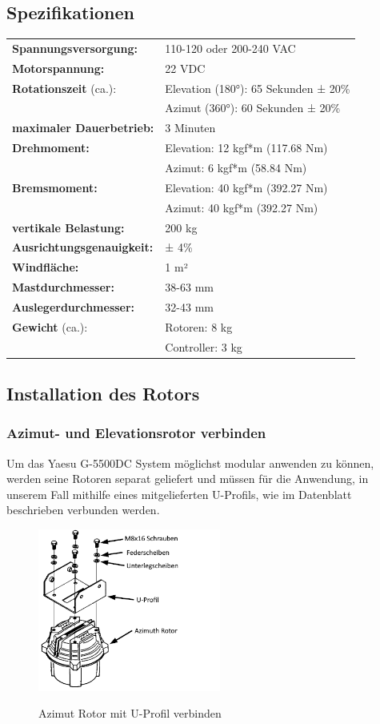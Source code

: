 \subsection{Spezifikationen}
\begin{tabular}{ l l }
	\textbf{Spannungsversorgung:} & 110-120 oder 200-240 VAC \\ 
	\textbf{Motorspannung:} & 22 VDC \\ 
	\textbf{Rotationszeit} (ca.): & Elevation (180°): 65 Sekunden ± 20\% \\
	& Azimut (360°): 60 Sekunden ± 20\% \\
	\textbf{maximaler Dauerbetrieb:} & 3 Minuten \\
	\textbf{Drehmoment:} & Elevation: 12 kgf*m (117.68 Nm)\\
	& Azimut: 6 kgf*m (58.84 Nm)\\
	\textbf{Bremsmoment:} & Elevation: 40 kgf*m (392.27 Nm) \\ &
	Azimut: 40 kgf*m (392.27 Nm) \\
	\textbf{vertikale Belastung:} & 200 kg \\
	\textbf{Ausrichtungsgenauigkeit:} & ± 4\% \\
	\textbf{Windfläche:} & 1 m²\\
	\textbf{Mastdurchmesser:} & 38-63 mm \\
	\textbf{Auslegerdurchmesser:} & 32-43 mm \\
	\textbf{Gewicht} (ca.): & Rotoren: 8 kg \\
	& Controller: 3 kg
\end{tabular}

\subsection{Installation des Rotors}
\subsubsection{Azimut- und Elevationsrotor verbinden}
Um das Yaesu G-5500DC System möglichst modular anwenden zu können, werden seine Rotoren separat geliefert und müssen für die Anwendung, in unserem Fall mithilfe eines mitgelieferten U-Profils, wie im Datenblatt \cite{noauthor_yaesu_nodate} beschrieben verbunden werden.

\begin{figure}[H]
	\centering
	\includegraphics[width=6cm]{../ref/RotorInstallationAzimut.png}
	\label{fig:Rotor_Installation_Azimut_U-Bracket}
	\caption{Azimut Rotor mit U-Profil verbinden \cite{noauthor_yaesu_nodate}}
\end{figure}


